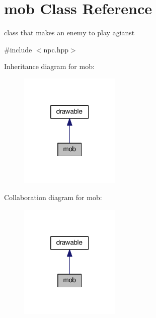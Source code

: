 \hypertarget{classmob}{}\section{mob Class Reference}
\label{classmob}


class that makes an enemy to play agianst  




{\ttfamily \#include $<$npc.\+hpp$>$}



Inheritance diagram for mob\+:\nopagebreak
\begin{figure}[H]
\begin{center}
\leavevmode
\includegraphics[width=136pt]{classmob__inherit__graph}
\end{center}
\end{figure}


Collaboration diagram for mob\+:\nopagebreak
\begin{figure}[H]
\begin{center}
\leavevmode
\includegraphics[width=136pt]{classmob__coll__graph}
\end{center}
\end{figure}
